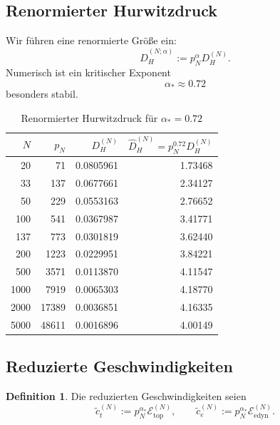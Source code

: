 \documentclass[a4paper,12pt]{article}
\theoremstyle{definition}
\newtheorem{definition}[satz]{Definition}
\numberwithin{equation}{section}
\begin{document}
	\subsection{Renormierter Hurwitzdruck}
	
	Wir führen eine renormierte Größe ein:
	\begin{equation}
		\widehat D_H^{(N;\alpha)}:=p_N^\alpha D_H^{(N)}.
	\end{equation}
	Numerisch ist ein kritischer Exponent
	\[
	\alpha_\ast\approx 0.72
	\]
	besonders stabil.
	
	\begin{table}[htbp]
		\centering
		\caption{Renormierter Hurwitzdruck für \(\alpha_\ast=0.72\)}
		\begin{tabular}{@{}rrrr@{}}
			\toprule
			\(N\) & \(p_N\) & \(D_H^{(N)}\) & \(\widehat D_H^{(N)}=p_N^{0.72}D_H^{(N)}\) \\
			\midrule
			20   & 71    & 0.0805961 & 1.73468 \\
			33   & 137   & 0.0677661 & 2.34127 \\
			50   & 229   & 0.0553163 & 2.76652 \\
			100  & 541   & 0.0367987 & 3.41771 \\
			137  & 773   & 0.0301819 & 3.62440 \\
			200  & 1223  & 0.0229951 & 3.84221 \\
			500  & 3571  & 0.0113870 & 4.11547 \\
			1000 & 7919  & 0.0065303 & 4.18770 \\
			2000 & 17389 & 0.0036851 & 4.16335 \\
			5000 & 48611 & 0.0016896 & 4.00149 \\
			\bottomrule
		\end{tabular}
	\end{table}
	
	\subsection{Reduzierte Geschwindigkeiten}
	
	\begin{definition}
		Die reduzierten Geschwindigkeiten seien
		\begin{equation}
			\tilde c_t^{(N)}:=p_N^{\alpha_\ast}\mathcal E_{\mathrm{top}}^{(N)},
			\qquad
			\tilde c_e^{(N)}:=p_N^{\alpha_\ast}\mathcal E_{\mathrm{edyn}}^{(N)}.
		\end{equation}
	\end{definition}
	
\end{document}
